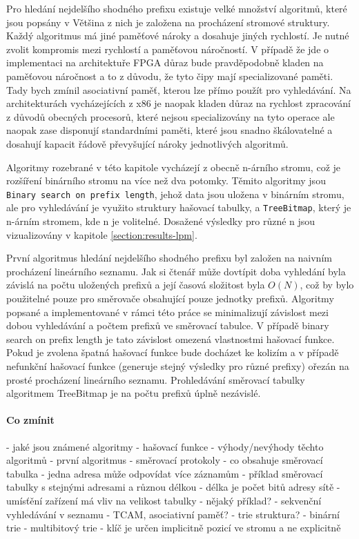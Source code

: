 Pro hledání nejdelšího shodného prefixu existuje velké množství algoritmů, které jsou popsány v \cite{tbm}
Většina z nich je založena na procházení stromové struktury. Každý algoritmus má jiné paměťové nároky
a dosahuje jiných rychlostí. Je nutné zvolit kompromis mezi rychlostí a paměťovou náročností.
V případě že jde o implementaci na architektuře FPGA důraz bude pravděpodobně kladen na paměťovou náročnost
a to z důvodu, že tyto čipy mají specializované paměti. Tady bych zmínil asociativní paměť, kterou
lze přímo použít pro vyhledávání. Na architekturách vycházejících z x86 je naopak kladen důraz
na rychlost zpracování z důvodů obecných procesorů, které nejsou specializovány na tyto operace
ale naopak zase disponují standardními paměti, které jsou snadno škálovatelné a dosahují kapacit
řádově převyšující nároky jednotlivých algoritmů.

Algoritmy rozebrané v této kapitole vycházejí z obecně n-árního stromu,
což je rozšíření binárního stromu na více než dva potomky. Těmito algoritmy jsou
\texttt{Binary search on prefix length}, jehož data jsou uložena v binárním stromu, ale pro vyhledávání
je využito struktury hašovací tabulky, a \texttt{TreeBitmap}, který je n-árním stromem, kde n je volitelné.
Dosažené výsledky pro různé n jsou vizualizovány v kapitole \ref{section:results-lpm}.

První algoritmus hledání nejdelšího shodného prefixu byl založen na naivním procházení lineárního
seznamu. Jak si čtenář může dovtípit doba vyhledání
byla závislá na počtu uložených prefixů a její časová složitost byla $O(N)$, což by bylo použitelné
pouze pro směrovače obsahující pouze jednotky prefixů.
Algoritmy popsané a implementované v rámci této práce se minimalizují závislost mezi dobou vyhledávání
a počtem prefixů ve směrovací tabulce. V případě binary search on prefix length je tato závislost
omezená vlastnostmi hašovací funkce. Pokud je zvolena špatná hašovací funkce bude docházet ke kolizím
a v případě nefunkční hašovací funkce (generuje stejný výsledky pro různé prefixy)
ořezán na prosté procházení lineárního seznamu.
Prohledávání směrovací tabulky algoritmem TreeBitmap je na počtu prefixů úplně nezávislé.

\paragraph{Co zmínit}
- jaké jsou známené algoritmy
- hašovací funkce
- výhody/nevýhody těchto algoritmů
- první algoritmus
- směrovací protokoly
- co obsahuje směrovací tabulka
- jedna adresa může odpovídat více záznamům
- příklad směrovací tabulky s stejnými adresami a různou délkou
- délka je počet bitů adresy sítě
- umísťění zařízení má vliv na velikost tabulky - nějaký příklad?
- sekvenční vyhledávání v seznamu
- TCAM, asociativní paměť?
- trie struktura?
- binární trie
- multibitový trie
- klíč je určen implicitně pozicí ve stromu a ne explicitně


